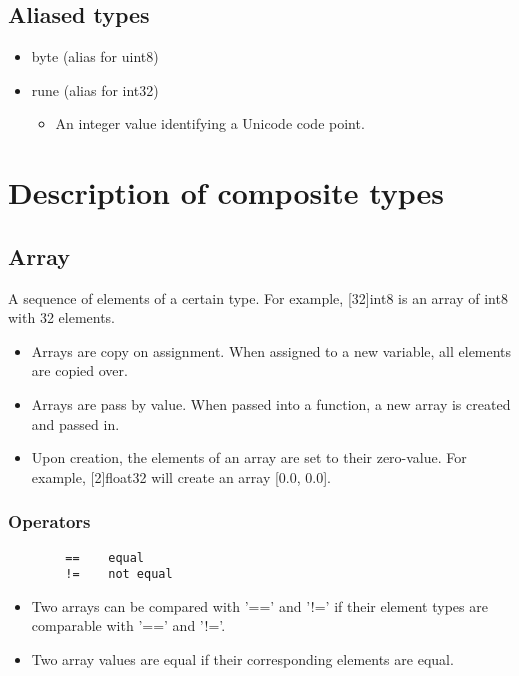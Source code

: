 \documentclass{article}
\begin{document}
			
    		\subsection{Aliased types}
			\begin{itemize}
    				\item byte (alias for uint8)		
    				\item rune (alias for int32)
				\begin{itemize}
					\item An integer value identifying a Unicode code point.
				\end{itemize}
			\end{itemize}
	

\section{Description of composite types}
	\subsection{Array}
		A sequence of elements of a certain type. For example, \colorbox{code}{[32]int8} is an array of int8 with 32 elements. 
		\begin{itemize}
			\item Arrays are copy on assignment. When assigned to a new variable, all elements are copied over.
			\item Arrays are pass by value. When passed into a function, a new array is created and passed in. 
			\item Upon creation, the elements of an array are set to their zero-value. For example, \colorbox{code}{[2]float32} will create an array \colorbox{code}{[0.0, 0.0]}.
		\end{itemize}
		\subsubsection{Operators}
		\begin{verbatim}
	    ==    equal
	    !=    not equal
		\end{verbatim}
		\begin{itemize}
			\item Two arrays can be compared with '==' and '!=' if their element types are comparable with '==' and '!='. 
			\item Two array values are equal if their corresponding elements are equal.
		\end{itemize}
		
\end{document}

